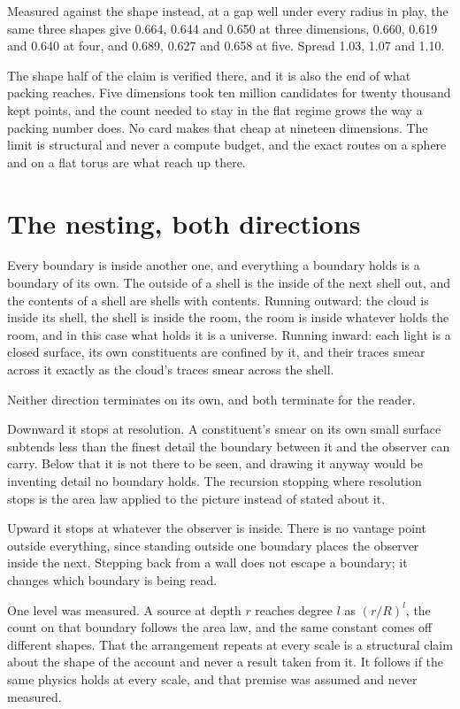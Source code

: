 Measured against the shape instead, at a gap well under every radius in play, the same three shapes
give 0.664, 0.644 and 0.650 at three dimensions, 0.660, 0.619 and 0.640 at four, and 0.689, 0.627
and 0.658 at five. Spread 1.03, 1.07 and 1.10.

The shape half of the claim is verified there, and it is also the end of what packing reaches. Five
dimensions took ten million candidates for twenty thousand kept points, and the count needed to stay
in the flat regime grows the way a packing number does. No card makes that cheap at nineteen
dimensions. The limit is structural and never a compute budget, and the exact routes on a sphere and
on a flat torus are what reach up there.

\section{The nesting, both directions}

Every boundary is inside another one, and everything a boundary holds is a boundary of its own. The
outside of a shell is the inside of the next shell out, and the contents of a shell are shells with
contents. Running outward: the cloud is inside its shell, the shell is inside the room, the room is
inside whatever holds the room, and in this case what holds it is a universe. Running inward: each
light is a closed surface, its own constituents are confined by it, and their traces smear across it
exactly as the cloud's traces smear across the shell.

Neither direction terminates on its own, and both terminate for the reader.

Downward it stops at resolution. A constituent's smear on its own small surface subtends less than
the finest detail the boundary between it and the observer can carry. Below that it is not there
to be seen, and drawing it anyway would be inventing detail no boundary holds. The recursion
stopping where resolution stops is the area law applied to the picture instead of stated about it.

Upward it stops at whatever the observer is inside. There is no vantage point outside everything,
since standing outside one boundary places the observer inside the next. Stepping back from a wall
does not escape a boundary; it changes which boundary is being read.

One level was measured. A source at depth $r$ reaches degree $l$ as $(r/R)^l$, the count on that
boundary follows the area law, and the same constant comes off different shapes. That the
arrangement repeats at every scale is a structural claim about the shape of the account and never a
result taken from it. It follows if the same physics holds at every scale, and that premise was
assumed and never measured.

\nocite{src:Mandache-2001,src:Bekenstein-1981}
